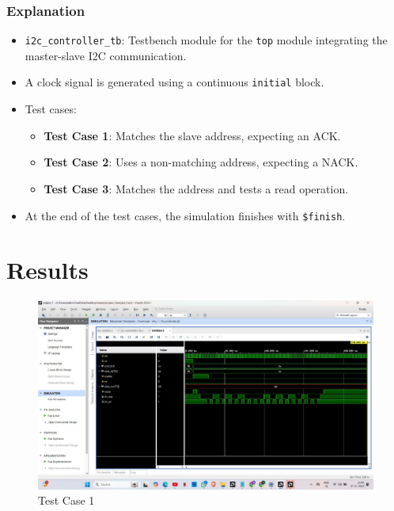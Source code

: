 \documentclass[a4paper,12pt]{report}
\begin{document}
\subsection{Explanation}
\begin{itemize}
    \item \texttt{i2c\_controller\_tb}: Testbench module for the \texttt{top} module integrating the master-slave I2C communication.
    \item A clock signal is generated using a continuous \texttt{initial} block.
    \item Test cases:
        \begin{itemize}
            \item \textbf{Test Case 1}: Matches the slave address, expecting an ACK.
            \item \textbf{Test Case 2}: Uses a non-matching address, expecting a NACK.
            \item \textbf{Test Case 3}: Matches the address and tests a read operation.
        \end{itemize}
    \item At the end of the test cases, the simulation finishes with \texttt{\$finish}.
\end{itemize}
\newpage


\chapter{Results}

\begin{figure}[H] %
    \centering
    \includegraphics[width=\textwidth]{TEST-CASE-1.jpg}
    \caption{Test Case 1}
\end{figure}
\FloatBarrier %
\end{document}
